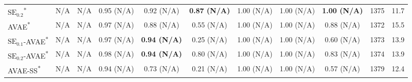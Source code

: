 \begin{table}[ht]
\begin{center}
\begin{small}
\begin{sc}
{\begin{tabular}{lcc|cccccc|ll}
$\text{SE}_{0.2}$\textsuperscript{*}
& N/A                & N/A                & 0.95 \tiny{(N/A)}  & 0.92 \tiny{(N/A)}  & \textbf{0.87 \tiny{(N/A)}}  & 1.00 \tiny{(N/A)}  & 1.00 \tiny{(N/A)}  & \textbf{1.00 \tiny{(N/A)}}  & 1375 & 11.7 \\
AVAE\textsuperscript{*} 
& N/A                & N/A                & 0.97 \tiny{(N/A)}  & 0.88 \tiny{(N/A)}  & 0.55 \tiny{(N/A)}  & 1.00 \tiny{(N/A)}  & 1.00 \tiny{(N/A)} & 0.88 \tiny{(N/A)}  & 1372 & 15.5\\
$\text{SE}_{0.1}$-AVAE\textsuperscript{*}
& N/A                & N/A                & 0.97 \tiny{(N/A)}  & \textbf{0.94 \tiny{(N/A)}}  & 0.25 \tiny{(N/A)}  & 1.00 \tiny{(N/A)}  & 1.00 \tiny{(N/A)}  & 0.60 \tiny{(N/A)}  & 1373 & 13.9\\
$\text{SE}_{0.2}$-AVAE\textsuperscript{*} 
& N/A                & N/A                & 0.98 \tiny{(N/A)}  & \textbf{0.94 \tiny{(N/A)}}  & 0.80 \tiny{(N/A)}  & 1.00 \tiny{(N/A)}  & 1.00 \tiny{(N/A)}  & 0.83 \tiny{(N/A)}  & 1374 & 13.9\\
AVAE-SS\textsuperscript{*} 
& N/A                & N/A                & 0.94 \tiny{(N/A)}  & 0.73 \tiny{(N/A)}  & 0.21 \tiny{(N/A)}  & 1.00 \tiny{(N/A)}  & 1.00 \tiny{(N/A)}  & 0.57 \tiny{(N/A)}  & 1379 & 12.4\\
\bottomrule
\end{tabular}}
\end{sc}
\end{small}
\end{center}
\vspace*{\baselineskip}
\end{table}

